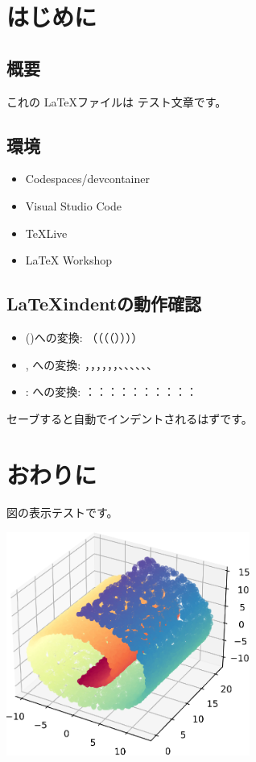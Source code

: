 \documentclass[12pt]{jreport}
\begin{document}
  \chapter{はじめに}
    \section{概要}
      これの \LaTeX ファイルは テスト文章です。
		\section{環境}
			\begin{itemize}
				\item Codespaces/devcontainer
				\item Visual Studio Code
				\item TeXLive
				\item LaTeX Workshop
			\end{itemize}
		\section{\LaTeX indentの動作確認}
			\begin{itemize}
				\item ()への変換: （（（（））））
				\item , への変換: ，，，，，，、、、、、、
				\item : への変換: ：：：：：：：：：： 
			\end{itemize}
			セーブすると自動でインデントされるはずです。
  \chapter{おわりに}
    図の表示テストです。
    
    \bigskip

		\includegraphics*[width=8cm]{./images/swissroll.eps}
\end{document}
